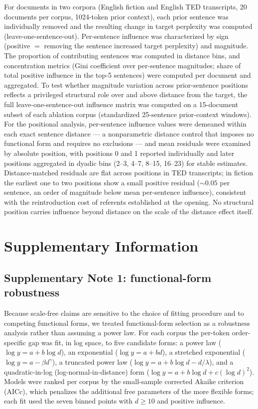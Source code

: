 \documentclass[11pt]{article}
\begin{document}
For documents in two corpora (English fiction and English TED transcripts, 20 documents per corpus,
1024-token prior context), each prior sentence was individually removed and the resulting change in
target perplexity was computed (leave-one-sentence-out). Per-sentence influence was characterized by
sign (positive $=$ removing the sentence increased target perplexity) and magnitude. The proportion
of contributing sentences was computed in distance bins, and concentration metrics (Gini coefficient
over per-sentence magnitudes; share of total positive influence in the top-5 sentences) were computed
per document and aggregated. To test whether magnitude variation across prior-sentence positions
reflects a privileged structural role over and above distance from the target, the full
leave-one-sentence-out influence matrix was computed on a 15-document subset of each ablation corpus
(standardized 25-sentence prior-context windows). For the positional analysis, per-sentence
influence values were demeaned within each exact sentence distance --- a nonparametric distance
control that imposes no functional form and requires no exclusions --- and mean residuals were
examined by absolute position, with positions 0 and 1 reported individually and later positions
aggregated in dyadic bins (2--3, 4--7, 8--15, 16--23) for stable estimates.
Distance-matched residuals are flat across positions in TED transcripts; in fiction the earliest
one to two positions show a small positive residual (${\sim}0.05$ per sentence, an order of
magnitude below mean per-sentence influence), consistent with the reintroduction cost of referents
established at the opening. No structural position carries influence beyond distance on the scale
of the distance effect itself.

\section*{Supplementary Information}

\subsection*{Supplementary Note 1: functional-form robustness}

Because scale-free claims are sensitive to the choice of fitting procedure and to
competing functional forms, we treated functional-form selection as a robustness analysis
rather than assuming a power law. For each corpus the per-token order-specific gap was fit,
in log space, to five candidate forms: a power law ($\log y = a + b\log d$), an exponential
($\log y = a + bd$), a stretched exponential ($\log y = a - \beta d^{\gamma}$), a truncated
power law ($\log y = a + b\log d - d/\lambda$), and a quadratic-in-log (log-normal-in-distance)
form ($\log y = a + b\log d + c(\log d)^2$). Models were ranked per corpus by the small-sample
corrected Akaike criterion (AICc), which penalizes the additional free parameters of the more
flexible forms; each fit used the seven binned points with $d \geq 10$ and positive influence.
\end{document}
